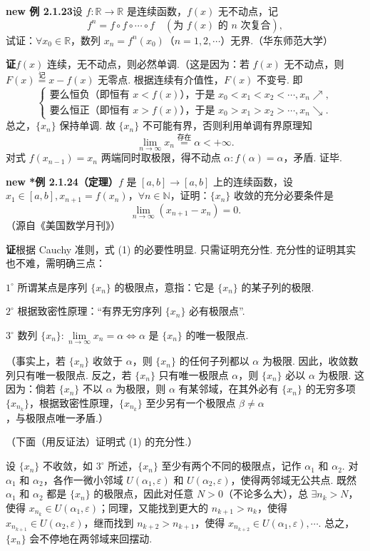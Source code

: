 \documentclass[UTF8, 12pt, fontset=fandol, oneside]{ctexart}
\begin{document}
\noindent\textbf{new 例 2.1.23}\quad 设 $f:\mathbb{R}\to\mathbb{R}$ 是连续函数，$f(x)$ 无不动点，记
\[
  f^n=f\circ f\circ\cdots\circ f\quad(\text{为 }f(x)\text{ 的 }n\text{ 次复合}),
\]
试证：$\forall x_0\in\mathbb{R}$，数列 $x_n=f^n(x_0)$（$n=1,2,\cdots$）无界.（华东师范大学）

\noindent\textbf{证}\quad $f(x)$ 连续，无不动点，则必然单调.（这是因为：若 $f(x)$ 无不动点，则 $F(x)\overset{\text{记}}=x-f(x)$ 无零点. 根据连续有介值性，$F(x)$ 不变号. 即
\[
  \begin{cases}
    \text{要么恒负（即恒有 }x<f(x)\text{），于是 }x_0<x_1<x_2<\cdots,x_n\nearrow,\\
    \text{要么恒正（即恒有 }x>f(x)\text{），于是 }x_0>x_1>x_2>\cdots,x_n\searrow.
  \end{cases}
\]
总之，$\{x_n\}$ 保持单调. 故 $\{x_n\}$ 不可能有界，否则利用单调有界原理知
\[
  \lim_{n\to\infty}x_n\overset{\text{存在}}=\alpha<+\infty.
\]
对式 $f(x_{n-1})=x_n$ 两端同时取极限，得不动点 $\alpha:f(\alpha)=\alpha$，矛盾. 证毕.

\noindent\textbf{new *例 2.1.24（定理）}\quad $f$ 是 $[a,b]\to[a,b]$ 上的连续函数，设 $x_1\in[a,b],x_{n+1}=f(x_n)$，$\forall n\in\mathbb{N}$，证明：$\{x_n\}$ 收敛的充分必要条件是
\[
  \lim_{n\to\infty}(x_{n+1}-x_n)=0.
\tag{1}
\]
（源自《美国数学月刊》）

\noindent\textbf{证}\quad 根据 Cauchy 准则，式 (1) 的必要性明显. 只需证明充分性. 充分性的证明其实也不难，需明确三点：

$1^\circ$ 所谓某点是序列 $\{x_n\}$ 的极限点，意指：它是 $\{x_n\}$ 的某子列的极限.

$2^\circ$ 根据致密性原理：“有界无穷序列 $\{x_n\}$ 必有极限点”.

$3^\circ$ 数列 $\{x_n\}:\lim\limits_{n\to\infty}x_n=\alpha\Leftrightarrow\alpha$ 是 $\{x_n\}$ 的唯一极限点.

（事实上，若 $\{x_n\}$ 收敛于 $\alpha$，则 $\{x_n\}$ 的任何子列都以 $\alpha$ 为极限. 因此，收敛数列只有唯一极限点. 反之，若 $\{x_n\}$ 只有唯一极限点 $\alpha$，则 $\{x_n\}$ 必以 $\alpha$ 为极限. 这因为：倘若 $\{x_n\}$ 不以 $\alpha$ 为极限，则 $\alpha$ 有某邻域，在其外必有 $\{x_n\}$ 的无穷多项 $\{x_{n_k}\}$，根据致密性原理，$\{x_{n_k}\}$ 至少另有一个极限点 $\beta\ne\alpha$，与极限点唯一矛盾.）

（下面（用反证法）证明式 (1) 的充分性.）

设 $\{x_n\}$ 不收敛，如 $3^\circ$ 所述，$\{x_n\}$ 至少有两个不同的极限点，记作 $\alpha_1$ 和 $\alpha_2$. 对 $\alpha_1$ 和 $\alpha_2$，各作一微小邻域 $U(\alpha_1,\varepsilon)$ 和 $U(\alpha_2,\varepsilon)$，使得两邻域无公共点. 既然 $\alpha_1$ 和 $\alpha_2$ 都是 $\{x_n\}$ 的极限点，因此对任意 $N>0$（不论多么大），总 $\exists n_k>N$，使得 $x_{n_k}\in U(\alpha_1,\varepsilon)$；同理，又能找到更大的 $n_{k+1}>n_k$，使得 $x_{n_{k+1}}\in U(\alpha_2,\varepsilon)$，继而找到 $n_{k+2}>n_{k+1}$，使得 $x_{n_{k+2}}\in U(\alpha_1,\varepsilon),\cdots$. 总之，$\{x_n\}$ 会不停地在两邻域来回摆动.
\end{document}
